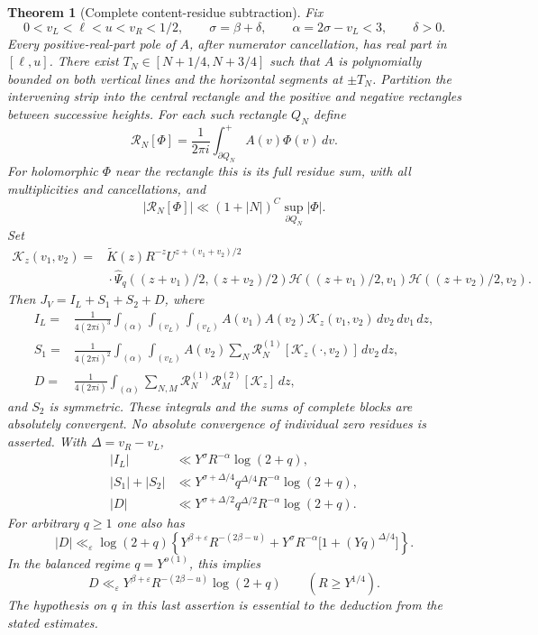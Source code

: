 \documentclass[11pt]{article}
\numberwithin{equation}{section}
\newcommand{\HH}{\mathcal H}
\newtheorem{theorem}{Theorem}[section]
\begin{document}
\begin{theorem}[Complete content-residue subtraction]\label{res:main}
Fix
\[
 0<v_L<\ell<u<v_R<1/2,\qquad
 \sigma=\beta+\delta,\qquad \alpha=2\sigma-v_L<3,
 \qquad \delta>0.
\]
Every positive-real-part pole of \(A\), after numerator cancellation,
has real part in \([\ell,u]\). There exist
\(T_N\in[N+1/4,N+3/4]\) such that \(A\) is polynomially bounded
on both vertical lines and the horizontal segments at \(\pm T_N\).
Partition the intervening strip into the central rectangle and
the positive and negative rectangles between successive heights.
For each such rectangle \(Q_N\) define
\[
 \mathcal R_N[\Phi]=\frac1{2\pi i}
 \int_{\partial Q_N}^{+}A(v)\Phi(v)\,dv.
\]
For holomorphic \(\Phi\) near the rectangle this is its full
residue sum, with all multiplicities and cancellations, and
\[
 |\mathcal R_N[\Phi]|
 \ll(1+|N|)^C\sup_{\partial Q_N}|\Phi|.
\]
Set
\begin{align*}
 \mathcal K_z(v_1,v_2)
 ={}&\widetilde K(z)R^{-z}U^{z+(v_1+v_2)/2}\\
 &{}\cdot\widehat\Psi_q((z+v_1)/2,(z+v_2)/2)
 \HH((z+v_1)/2,v_1)\HH((z+v_2)/2,v_2).
\end{align*}
Then \(J_V=I_L+S_1+S_2+D\), where
\begin{align*}
 I_L={}&\frac1{4(2\pi i)^3}
 \int_{(\alpha)}\int_{(v_L)}\int_{(v_L)}
 A(v_1)A(v_2)\mathcal K_z(v_1,v_2)\,dv_2\,dv_1\,dz,\\
 S_1={}&\frac1{4(2\pi i)^2}
 \int_{(\alpha)}\int_{(v_L)}
 A(v_2)\sum_N\mathcal R_N^{(1)}
 [\mathcal K_z(\cdot,v_2)]\,dv_2\,dz,\\
 D={}&\frac1{4(2\pi i)}
 \int_{(\alpha)}\sum_{N,M}
 \mathcal R_N^{(1)}\mathcal R_M^{(2)}[\mathcal K_z]\,dz,
\end{align*}
and \(S_2\) is symmetric. These integrals and the sums of complete
blocks are absolutely convergent. No absolute convergence of
individual zero residues is asserted. With \(\Delta=v_R-v_L\),
\begin{align*}
 |I_L|&\ll Y^\sigma R^{-\alpha}\log(2+q),\\
 |S_1|+|S_2|&\ll
 Y^{\sigma+\Delta/4}q^{\Delta/4}R^{-\alpha}\log(2+q),\\
 |D|&\ll
 Y^{\sigma+\Delta/2}q^{\Delta/2}R^{-\alpha}\log(2+q).
\end{align*}
For arbitrary \(q\ge1\) one also has
\begin{equation}\label{res:main-general-q}
 |D|\ll_\varepsilon\log(2+q)
 \left\{Y^{\beta+\varepsilon}R^{-(2\beta-u)}
 +Y^\sigma R^{-\alpha}\bigl[1+(Yq)^{\Delta/4}\bigr]\right\}.
\end{equation}
In the balanced regime \(q=Y^{o(1)}\), this implies
\begin{equation}\label{res:main-balanced}
 D\ll_\varepsilon Y^{\beta+\varepsilon}
 R^{-(2\beta-u)}\log(2+q)
 \qquad (R\ge Y^{1/4}).
\end{equation}
The hypothesis on \(q\) in this last assertion is essential to
the deduction from the stated estimates.
\end{theorem}
\end{document}

